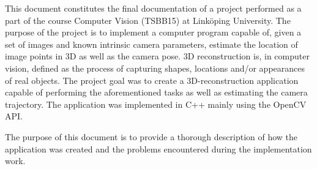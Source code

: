 This document constitutes the final documentation of a project performed as a part of the course Computer Vision (TSBB15) at Linköping University. The purpose of the project is to implement a computer program capable of, given a set of images and known intrinsic camera parameters, estimate the location of image points in 3D as well as the camera pose. 3D reconstruction is, in computer vision, defined as the process of capturing shapes, locations and/or appearances of real objects. The project goal was to create a 3D-reconstruction application capable of performing the aforementioned tasks as well as estimating the camera trajectory. The application was implemented in C++ mainly using the OpenCV API.

The purpose of this document is to provide a thorough description of how the application was created and the problems encountered during the implementation work.
